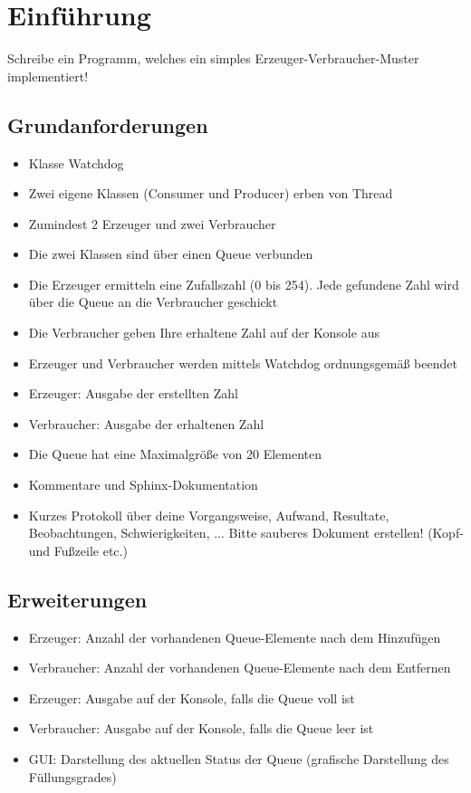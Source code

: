 
\section{Einführung}
Schreibe ein Programm, welches ein simples Erzeuger-Verbraucher-Muster implementiert!

\subsection{Grundanforderungen}

\begin{itemize}
	\item Klasse Watchdog
	\item Zwei eigene Klassen (Consumer und Producer) erben von Thread
	\item Zumindest 2 Erzeuger und zwei Verbraucher 
	\item Die zwei Klassen sind über einen Queue verbunden
	\item Die Erzeuger ermitteln eine Zufallszahl (0 bis 254). Jede gefundene Zahl wird über die Queue an die Verbraucher geschickt
	\item Die Verbraucher geben Ihre erhaltene Zahl auf der Konsole aus
	\item Erzeuger und Verbraucher werden mittels Watchdog ordnungsgemäß beendet
	\item Erzeuger: Ausgabe der erstellten Zahl
	\item Verbraucher: Ausgabe der erhaltenen Zahl
	\item Die Queue hat eine Maximalgröße von 20 Elementen
	\item Kommentare und Sphinx-Dokumentation
	\item Kurzes Protokoll über deine Vorgangsweise, Aufwand, Resultate, Beobachtungen, Schwierigkeiten, ... Bitte sauberes Dokument erstellen! (Kopf- und Fußzeile etc.)
\end{itemize}


\subsection{Erweiterungen}
\begin{itemize}
	\item Erzeuger: Anzahl der vorhandenen Queue-Elemente nach dem Hinzufügen
	\item Verbraucher: Anzahl der vorhandenen Queue-Elemente nach dem Entfernen
	\item Erzeuger: Ausgabe auf der Konsole, falls die Queue voll ist
	\item Verbraucher: Ausgabe auf der Konsole, falls die Queue leer ist
	\item GUI: Darstellung des aktuellen Status der Queue (grafische Darstellung des Füllungsgrades)
\end{itemize}
\clearpage
